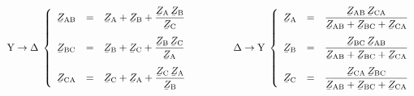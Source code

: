 \begin{equation}\label{eq:Y_D}
   \text{Y}\rightarrow\Delta\;\left\{
   \begin{array}{lll}
      \cmplx{Z}\ped{AB} &= &\displaystyle \cmplx{Z}\ped{A} + \cmplx{Z}\ped{B} + \frac{\cmplx{Z}\ped{A}\,\cmplx{Z}\ped{B}}{\cmplx{Z}\ped{C}}  \\[3ex]
      \cmplx{Z}\ped{BC} &= &\displaystyle \cmplx{Z}\ped{B} + \cmplx{Z}\ped{C} + \frac{\cmplx{Z}\ped{B}\,\cmplx{Z}\ped{C}}{\cmplx{Z}\ped{A}}  \\[3ex]
      \cmplx{Z}\ped{CA} &= &\displaystyle \cmplx{Z}\ped{C} + \cmplx{Z}\ped{A} + \frac{\cmplx{Z}\ped{C}\, \cmplx{Z}\ped{A}}{\cmplx{Z}\ped{B}}
   \end{array}
   \right.
   \qquad\qquad
   \Delta\rightarrow\text{Y}\;\left\{
   \begin{array}{lll}
      \cmplx{Z}\ped{A} &= &\dfrac{\cmplx{Z}\ped{AB}\, \cmplx{Z}\ped{CA}}{  \cmplx{Z}\ped{AB} + \cmplx{Z}\ped{BC}+ \cmplx{Z}\ped{CA}}  \\[3ex]
      \cmplx{Z}\ped{B} &= &\dfrac{\cmplx{Z}\ped{BC}\, \cmplx{Z}\ped{AB}}{  \cmplx{Z}\ped{AB} + \cmplx{Z}\ped{BC}+ \cmplx{Z}\ped{CA}}  \\[3ex]
      \cmplx{Z}\ped{C} &= &\dfrac{\cmplx{Z}\ped{CA}\, \cmplx{Z}\ped{BC}}{  \cmplx{Z}\ped{AB} + \cmplx{Z}\ped{BC}+ \cmplx{Z}\ped{CA}}
   \end{array}
   \right.
\end{equation}

\begin{center}
    
    \label{pic:Y_D}
\end{center}

